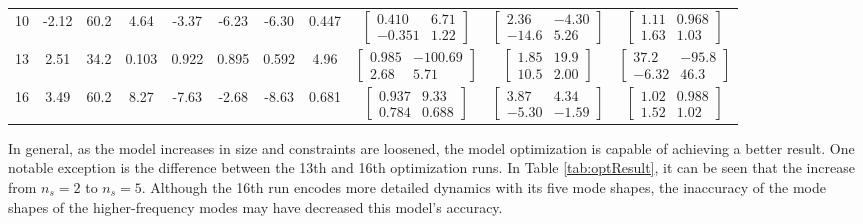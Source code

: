 \begin{landscape}
\begin{table}[H]
\begin{tabular}{ccccccccccc}
		10 & -2.12 & 60.2 & 4.64 & -3.37 & -6.23 & -6.30 & 0.447 & $\begin{bmatrix}0.410 & 6.71 \\ -0.351 & 1.22\end{bmatrix}$ & $\begin{bmatrix}2.36 & -4.30 \\ -14.6 & 5.26\end{bmatrix}$ & $\begin{bmatrix}1.11 & 0.968 \\ 1.63 & 1.03\end{bmatrix}$ \\
		13 & 2.51 & 34.2 & 0.103 & 0.922 & 0.895 & 0.592 & 4.96 & $\begin{bmatrix}0.985 & -100.69 \\ 2.68 & 5.71\end{bmatrix}$ & $\begin{bmatrix}1.85 & 19.9 \\ 10.5 & 2.00\end{bmatrix}$ & $\begin{bmatrix}37.2 & -95.8 \\ -6.32 & 46.3\end{bmatrix}$ \\
		16 & 3.49 & 60.2 & 8.27 & -7.63 & -2.68 & -8.63 & 0.681 & $\begin{bmatrix}0.937 & 9.33 \\ 0.784 & 0.688\end{bmatrix}$ & $\begin{bmatrix}3.87 & 4.34 \\ -5.30 & -1.59\end{bmatrix}$ & $\begin{bmatrix}1.02 & 0.988 \\ 1.52 & 1.02\end{bmatrix}$ \\
		\hline\hline
	\end{tabular}
\end{table}

\end{landscape}

In general, as the model increases in size and constraints are loosened, the model optimization is capable of achieving a better result. One notable exception is the difference between the 13th and 16th optimization runs. In Table \ref{tab:optResult}, it can be seen that the increase from $n_s=2$ to $n_s=5$. Although the 16th run encodes more detailed dynamics with its five mode shapes, the inaccuracy of the mode shapes of the higher-frequency modes may have decreased this model's accuracy.

